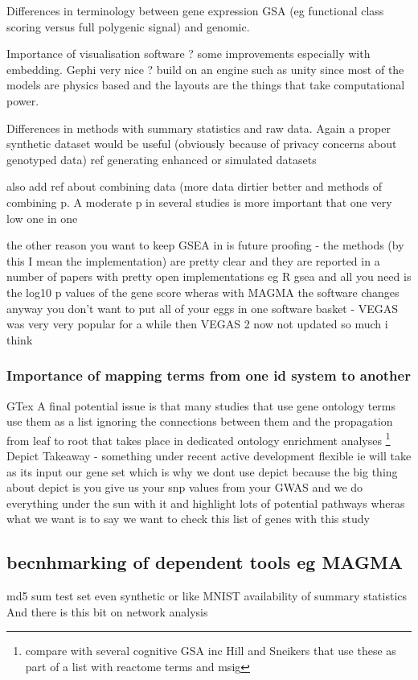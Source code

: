  Differences in terminology between gene expression GSA (eg functional class scoring versus full polygenic signal) and genomic. 
 
 Importance of visualisation software ? some improvements especially with embedding. Gephi very nice ? build on an engine such as unity since most of the models are physics based and the layouts are the things that take computational power.
 
 Differences in methods with summary statistics and raw data. Again a proper synthetic dataset would be useful (obviously because of privacy concerns about genotyped data) ref generating enhanced or simulated datasets 
 
 also add ref about combining data (more data dirtier better  and methods of combining p. A moderate p in several studies is more important that one very low one in one
 
 the other reason you want to keep GSEA in is future proofing - the methods (by this I mean the implementation) are pretty clear and they are reported in a number of papers with pretty open implementations eg R gsea and all you need is the log10 p values of the gene score wheras with MAGMA the software changes anyway you don't want to put all of your eggs in one software basket - VEGAS was very very popular for a while then VEGAS 2 now not updated so much i think
  \subsubsection{Importance of mapping terms from one id system to another}
 GTex
 A final potential issue is that many studies that use gene ontology terms use them as a list ignoring the connections between them and the propagation from leaf to root that takes place in dedicated ontology enrichment analyses \cite{rhee2008use}\cite{mi2019protocol} \footnote{compare with several cognitive GSA inc Hill and Sneikers that use these as part of a list with reactome terms and msig}
 Depict
Takeaway - something under recent active development flexible ie will take as its input our gene set which is why we dont use depict because the big thing about depict is you give us your snp values from your GWAS and we do everything under the sun with it and highlight lots of potential pathways wheras what we want is to say we want to check this list of genes with this study 
\subsection{becnhmarking of dependent tools eg MAGMA}
md5 sum
\cite{kim2018experimenting}
test set even synthetic or like MNIST
availability of summary statistics
And there is this bit on network analysis\cite{flint2019great}
